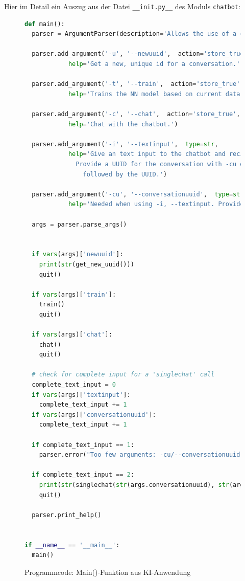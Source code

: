 \documentclass[12pt,oneside,titlepage,listof=totoc,bibliography=totoc]{scrartcl}
\newcommand{\code}[1]{\colorbox{code-gray}{\texttt{#1}}}
\begin{document}
Hier im Detail ein Auszug aus der Datei \code{__init.py__} des Moduls \code{chatbot}:
\begin{figure}[H]
	\caption{Programmcode: Main()-Funktion aus KI-Anwendung}
	\label{fig:code-main-func}
\begin{lstlisting}[language=python]
def main():
  parser = ArgumentParser(description='Allows the use of a chatbot with PyTorch.')

  parser.add_argument('-u', '--newuuid',  action='store_true',
            help='Get a new, unique id for a conversation.')

  parser.add_argument('-t', '--train',  action='store_true',
            help='Trains the NN model based on current data.')

  parser.add_argument('-c', '--chat',  action='store_true',
            help='Chat with the chatbot.')

  parser.add_argument('-i', '--textinput',  type=str,
            help='Give an text input to the chatbot and recive a answer. \
              Provide a UUID for the conversation with -cu or --conversationuuid \
                followed by the UUID.')

  parser.add_argument('-cu', '--conversationuuid',  type=str,
            help='Needed when using -i, --textinput. Provide a UUID to a conversation.')

  args = parser.parse_args()

  
  if vars(args)['newuuid']:
    print(str(get_new_uuid()))
    quit()

  if vars(args)['train']:
    train()
    quit()  

  if vars(args)['chat']:
    chat()
    quit()
    
  # check for complete input for a 'singlechat' call
  complete_text_input = 0
  if vars(args)['textinput']:
    complete_text_input += 1 
  if vars(args)['conversationuuid']:     
    complete_text_input += 1 

  if complete_text_input == 1:
    parser.error("Too few arguments: -cu/--conversationuuid and -i/--textinput are both needed.")
  
  if complete_text_input == 2:
    print(str(singlechat(str(args.conversationuuid), str(args.textinput))))
    quit()

  parser.print_help()


if __name__ == '__main__':
  main()
\end{lstlisting}
\end{figure}
\end{document}
